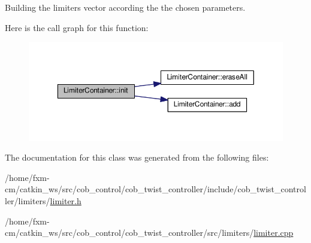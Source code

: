 Building the limiters vector according the the chosen parameters. 

Here is the call graph for this function\-:
\nopagebreak
\begin{figure}[H]
\begin{center}
\leavevmode
\includegraphics[width=350pt]{classLimiterContainer_a28eac48f36b165d02c86449189aacea2_cgraph}
\end{center}
\end{figure}




The documentation for this class was generated from the following files\-:\begin{DoxyCompactItemize}
\item 
/home/fxm-\/cm/catkin\-\_\-ws/src/cob\-\_\-control/cob\-\_\-twist\-\_\-controller/include/cob\-\_\-twist\-\_\-controller/limiters/\hyperlink{limiter_8h}{limiter.\-h}\item 
/home/fxm-\/cm/catkin\-\_\-ws/src/cob\-\_\-control/cob\-\_\-twist\-\_\-controller/src/limiters/\hyperlink{limiter_8cpp}{limiter.\-cpp}\end{DoxyCompactItemize}
